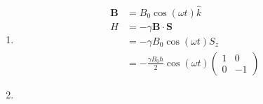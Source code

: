 \documentclass{article}
\renewcommand{\vec}[1]{\boldsymbol{\mathbf{#1}}}
\begin{document}
\subsection{}

\begin{enumerate}
  \item

        \begin{align*}
          \vec{B} & = B_0 \cos (\omega t) \hat{k}                                \\
          H       & = -\gamma \vec{B} \cdot \vec{S}                              \\
                  & = -\gamma B_0 \cos (\omega t) S_z                            \\
                  & = -\frac{\gamma B_0 \hbar}{2} \cos (\omega t) \begin{pmatrix}
                                                                    1 & 0  \\
                                                                    0 & -1
                                                                  \end{pmatrix}
        \end{align*}

  \item


\end{enumerate}
\end{document}
